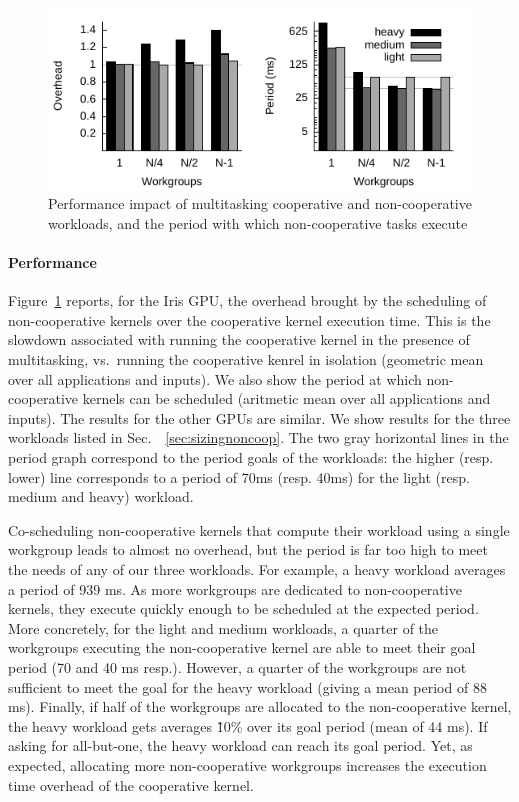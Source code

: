 \documentclass[numbers,nocopyrightspace,10pt]{sigplanconf}
\newcommand{\myfiglong}{Figure~}
\newcommand{\mysec}{Sec.~}
\begin{document}
\begin{figure}
\includegraphics[width=\columnwidth]{heavy.pdf} 
\caption{Performance impact of multitasking cooperative and non-cooperative workloads, and the period with which non-cooperative tasks execute}\label{fig:performance}
\end{figure}


\paragraph{Performance} 
\myfiglong\ref{fig:performance} reports, for the Iris GPU, the overhead brought by the scheduling of
non-cooperative kernels over the cooperative kernel execution time.  This is the slowdown associated with running the cooperative kernel in the presence of multitasking, vs.\ running the cooperative kenrel in isolation (geometric mean over all applications and inputs).  We also show the period at which non-cooperative kernels can be scheduled (aritmetic mean over all applications
and inputs).
The results for the other GPUs are similar.
 We show
results for the three workloads listed in
\mysec~\ref{sec:sizingnoncoop}. The two gray horizontal lines in the
period graph correspond to the period goals of the workloads: the higher
(resp. lower) line corresponds to a period of 70ms (resp. 40ms) for the
light (resp. medium and heavy) workload.

Co-scheduling non-cooperative kernels that compute their workload using a single workgroup leads to almost no overhead, but the period is far too high to meet the needs
of any of our three workloads. For example, a heavy workload averages a
period of 939 ms. As more workgroups are dedicated to non-cooperative
kernels, they execute quickly enough to be scheduled at the expected
period. More concretely, for the light and medium workloads, a quarter
of the workgroups executing the non-cooperative kernel are able to meet
their goal period (70 and 40 ms resp.). However, a quarter of the
workgroups are not sufficient to meet the goal for the heavy workload
(giving a mean period of 88 ms). Finally, if half of the workgroups are
allocated to the non-cooperative kernel, the heavy workload gets
averages \~10\% over its goal period (mean of 44 ms). If asking for all-but-one, the heavy workload can reach its goal period.
%
Yet, as expected, allocating more non-cooperative workgroups increases
the execution time overhead of the cooperative kernel.
\end{document}
